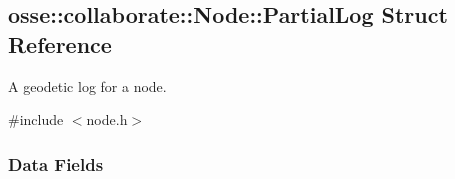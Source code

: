 \hypertarget{structosse_1_1collaborate_1_1_node_1_1_partial_log}{}\subsection{osse\+:\+:collaborate\+:\+:Node\+:\+:Partial\+Log Struct Reference}
\label{structosse_1_1collaborate_1_1_node_1_1_partial_log}


A geodetic log for a node.  




{\ttfamily \#include $<$node.\+h$>$}

\subsubsection*{Data Fields}
